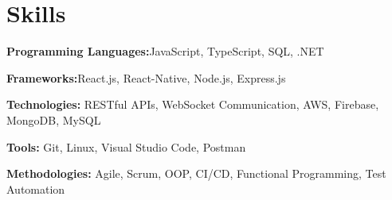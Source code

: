 \section{Skills}
\vspace{2pt}
\resumeSubHeadingListStart
\small{\item{

                  \textbf{Programming Languages:}{JavaScript, TypeScript, SQL, .NET} \\ \vspace{3pt}

                  \textbf{Frameworks:}{React.js, React-Native, Node.js, Express.js} \\ \vspace{3pt}

                  \textbf{Technologies:}{ RESTful APIs, WebSocket Communication, AWS, Firebase, MongoDB, MySQL} \\ \vspace{3pt}

                  \textbf{Tools:}{ Git, Linux, Visual Studio Code, Postman} \\ \vspace{3pt}

                  \textbf{Methodologies:}{ Agile, Scrum, OOP, CI/CD, Functional Programming, Test Automation} \\ \vspace{3pt}

            }}
\resumeSubHeadingListEnd
